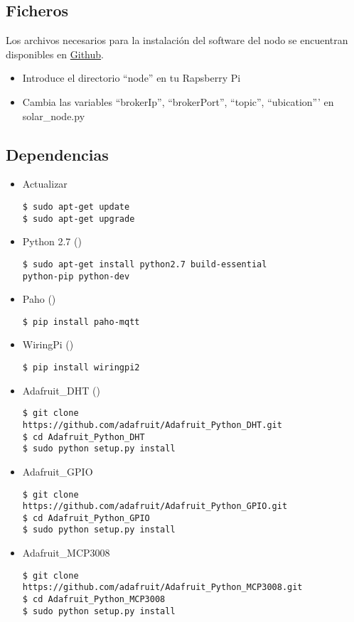 \subsection{Ficheros}
\label{makereference8.1.3}
Los archivos necesarios para la instalación del software del nodo se encuentran disponibles en \href{https://github.com/MrSlide22/TFG/node}{Github}.

\begin{itemize}
	\item Introduce el directorio ``node'' en tu Rapsberry Pi
	\item Cambia las variables ``brokerIp'', ``brokerPort'', ``topic'', ``ubication''' en solar\_node.py
\end{itemize}

\subsection{Dependencias}
\label{makereference8.1.4}
	\begin{itemize}
		\item Actualizar
\lstset{language=bash}
\begin{lstlisting}[frame=single]
$ sudo apt-get update
$ sudo apt-get upgrade
\end{lstlisting}
		\item Python 2.7 (\cite{ARP:Python:2017})
\begin{lstlisting}[frame=single]
$ sudo apt-get install python2.7 build-essential 
python-pip python-dev
\end{lstlisting}
		\item Paho (\cite{ARP:Paho:2017})
\begin{lstlisting}[frame=single]
$ pip install paho-mqtt
\end{lstlisting}
		\item WiringPi (\cite{ARP:Wiring:2017})
\begin{lstlisting}[frame=single]
$ pip install wiringpi2
\end{lstlisting}
		\item Adafruit\_DHT (\cite{ARP:Adafruit:2017})
\begin{lstlisting}[frame=single]
$ git clone 
https://github.com/adafruit/Adafruit_Python_DHT.git
$ cd Adafruit_Python_DHT
$ sudo python setup.py install
\end{lstlisting}
		\item Adafruit\_GPIO
\begin{lstlisting}[frame=single]
$ git clone 
https://github.com/adafruit/Adafruit_Python_GPIO.git
$ cd Adafruit_Python_GPIO
$ sudo python setup.py install
\end{lstlisting}
		\item Adafruit\_MCP3008
\begin{lstlisting}[frame=single]
$ git clone 
https://github.com/adafruit/Adafruit_Python_MCP3008.git
$ cd Adafruit_Python_MCP3008
$ sudo python setup.py install
\end{lstlisting}
	\end{itemize}

